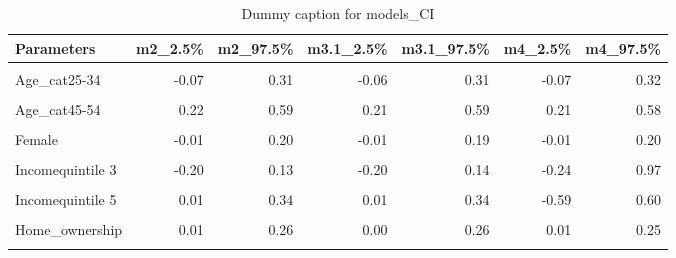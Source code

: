 \begin{table}
\centering
\caption{Dummy caption for models_CI}
\centering
\fontsize{10}{12}\selectfont
\begin{tabular}[t]{lrrrrrr}
\toprule
Parameters & m2\_2.5\% & m2\_97.5\% & m3.1\_2.5\% & m3.1\_97.5\% & m4\_2.5\% & m4\_97.5\%\\
\midrule
\cellcolor{gray!10}{(Intercept)} & \cellcolor{gray!10}{-0.68} & \cellcolor{gray!10}{0.86} & \cellcolor{gray!10}{-0.47} & \cellcolor{gray!10}{0.55} & \cellcolor{gray!10}{-0.65} & \cellcolor{gray!10}{0.55}\\
Age\_cat25-34 & -0.07 & 0.31 & -0.06 & 0.31 & -0.07 & 0.32\\
\cellcolor{gray!10}{Age\_cat35-44} & \cellcolor{gray!10}{0.03} & \cellcolor{gray!10}{0.40} & \cellcolor{gray!10}{0.02} & \cellcolor{gray!10}{0.41} & \cellcolor{gray!10}{0.03} & \cellcolor{gray!10}{0.41}\\
Age\_cat45-54 & 0.22 & 0.59 & 0.21 & 0.59 & 0.21 & 0.58\\
\cellcolor{gray!10}{Age\_cat55+} & \cellcolor{gray!10}{0.40} & \cellcolor{gray!10}{0.72} & \cellcolor{gray!10}{0.39} & \cellcolor{gray!10}{0.73} & \cellcolor{gray!10}{0.38} & \cellcolor{gray!10}{0.71}\\
Female & -0.01 & 0.20 & -0.01 & 0.19 & -0.01 & 0.20\\
\cellcolor{gray!10}{Incomequintile 2} & \cellcolor{gray!10}{-0.15} & \cellcolor{gray!10}{0.17} & \cellcolor{gray!10}{-0.15} & \cellcolor{gray!10}{0.18} & \cellcolor{gray!10}{-0.68} & \cellcolor{gray!10}{0.50}\\
Incomequintile 3 & -0.20 & 0.13 & -0.20 & 0.14 & -0.24 & 0.97\\
\cellcolor{gray!10}{Incomequintile 4} & \cellcolor{gray!10}{0.00} & \cellcolor{gray!10}{0.33} & \cellcolor{gray!10}{0.00} & \cellcolor{gray!10}{0.34} & \cellcolor{gray!10}{-0.10} & \cellcolor{gray!10}{1.14}\\
Incomequintile 5 & 0.01 & 0.34 & 0.01 & 0.34 & -0.59 & 0.60\\
\cellcolor{gray!10}{Higher\_edu} & \cellcolor{gray!10}{-0.08} & \cellcolor{gray!10}{0.13} & \cellcolor{gray!10}{-0.09} & \cellcolor{gray!10}{0.14} & \cellcolor{gray!10}{-0.08} & \cellcolor{gray!10}{0.13}\\
Home\_ownership & 0.01 & 0.26 & 0.00 & 0.26 & 0.01 & 0.25\\
\cellcolor{gray!10}{Dwelling\_house} & \cellcolor{gray!10}{-0.02} & \cellcolor{gray!10}{0.22} & \cellcolor{gray!10}{-0.02} & \cellcolor{gray!10}{0.23} & \cellcolor{gray!10}{-0.02} & \cellcolor{gray!10}{0.23}\\

\end{tabular}
\end{table}
